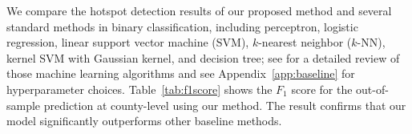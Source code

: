 \documentclass[journal]{IEEEtran}
\begin{document}
\begin{table}[!h]
{\begin{threeparttable}
\begin{tabular}{l:lll}
            \midrule[0.3pt]\bottomrule[1pt]
        \end{tabular}%
    \end{threeparttable}
}
\end{table}

We compare the hotspot detection results of our proposed method and several standard methods in binary classification, including perceptron, logistic regression, linear support vector machine (SVM), $k$-nearest neighbor ($k$-NN), kernel SVM with Gaussian kernel, and decision tree; see \cite{shalev2014understanding} for a detailed review of those machine learning algorithms and see Appendix~\ref{app:baseline} for hyperparameter choices. Table~\ref{tab:f1score} shows the $F_1$ score for the out-of-sample prediction at county-level using our method.
The result confirms that our model significantly outperforms other baseline methods. 


\end{document}
